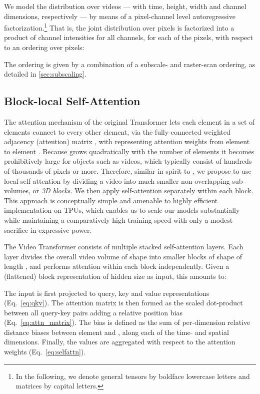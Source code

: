 \documentclass{article} \usepackage{iclr2020_conference,times}
\begin{document}
We model the distribution  over videos  --- with time, height, width and channel dimensions, respectively --- by means of a pixel-channel level autoregressive factorization.\footnote{In the following, we denote general tensors by boldface lowercase letters and matrices by capital letters.} That is, the joint distribution over pixels is factorized into a product of channel intensities for all  channels, for each of the  pixels, with respect to an ordering  over pixels:

The ordering  is given by a combination of a subscale- and raster-scan ordering, as detailed in \ref{sec:subscaling}.

\subsection{Block-local Self-Attention} \label{sec:selfattn}

The attention mechanism of the original Transformer lets each element in a set of  elements connect to every other element, via the fully-connected weighted adjacency (attention) matrix , with  representing attention weights from element  to element . Because  grows quadratically with the number of elements it becomes prohibitively large for objects such as videos, which typically consist of hundreds of thousands of pixels or more. Therefore, similar in spirit to \citet{Parmar2018ImageT}, we propose to use local self-attention by dividing a video into much smaller non-overlapping sub-volumes, or \emph{3D blocks}. We then apply self-attention separately within each block. This approach is conceptually simple and amenable to highly efficient implementation on TPUs, which enables us to scale our models substantially while maintaining a comparatively high training speed with only a modest sacrifice in expressive power.

The Video Transformer consists of multiple stacked self-attention layers. Each layer divides the overall video volume of shape  into smaller blocks of shape  of length , and performs attention within each block independently. Given a (flattened) block representation  of hidden size  as input, this amounts to:

The input is first projected to query, key and value representations (Eq.~\ref{eq:qkv}).
The attention matrix  is then formed as the scaled dot-product between all query-key pairs adding a relative position bias  \citep{Parikh2016ADA} (Eq.~\ref{eq:attn_matrix}).
The bias  is defined as the sum of per-dimension relative distance biases between element  and , along each of the time- and spatial dimensions.
Finally, the values are aggregated with respect to the attention weights (Eq.~\ref{eq:selfattn}).
\end{document}
